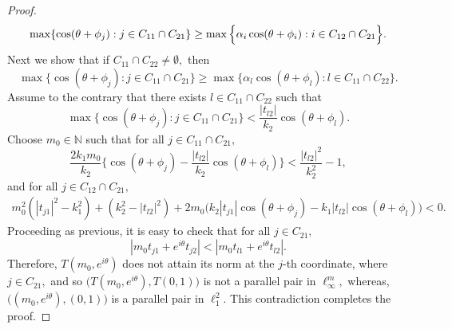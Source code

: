 \documentclass{amsart}
\theoremstyle{definition}
\theoremstyle{remark}
\numberwithin{equation}{section}
\begin{document}
\begin{proof}
\[\max\{\cos(\theta+\phi_j):j\in C_{11}\cap C_{21}\}\\
\geq \max\Big\{\alpha_i\cos(\theta+\phi_i):i\in C_{12}\cap C_{21}\Big\}.\]
Next we show that  if $C_{11}\cap C_{22}\neq \emptyset,$ then $$\max\{\cos(\theta+\phi_j):j\in C_{11}\cap C_{21}\}
\geq \max\Big\{\alpha_l\cos(\theta+\phi_l): l\in C_{11}\cap C_{22}\Big\}.$$ Assume to the contrary that there exists $l\in C_{11}\cap C_{22}$ such that 
\[\max\{\cos(\theta+\phi_j):j\in C_{11}\cap C_{21}\}<\frac{|t_{l2}|}{k_2}\cos(\theta+\phi_l).\]	
Choose $m_0\in \mathbb{N}$ such that for all $j\in C_{11}\cap C_{21},$
\[\frac{2k_1m_0}{k_2}\Big\{\cos(\theta+\phi_j)-\frac{|t_{l2}|}{k_2}\cos(\theta+\phi_l)\Big\}<\frac{|t_{l2}|^2}{k_2^2}-1,\]
and for all $j\in C_{12}\cap C_{21},$
\begin{eqnarray*}
	m_0^2(|t_{j1}|^2-k_1^2)+(k_2^2-|t_{l2}|^2)+2m_0\Big(k_2	|t_{j1}|\cos(\theta+\phi_j)-k_1|t_{l2}|\cos(\theta+\phi_l)\Big)<0.
\end{eqnarray*}
Proceeding as previous, it is easy to check that  for all $j\in C_{21},$
\[|m_0t_{j1}+e^{i\theta}t_{j2}|<|m_0t_{l1}+e^{i\theta}t_{l2}|.\]
Therefore, $T(m_0,e^{i\theta})$ does not attain its norm at the $j$-th coordinate, where $j\in C_{21},$ and so $\Big(T(m_0,e^{i\theta}),T(0,1)\Big)$ is not a parallel pair in $\ell_\infty^m,$ whereas, $\Big((m_0,e^{i\theta}),(0,1)\Big)$ is a parallel pair in $\ell_1^2.$ This contradiction completes the proof.

\end{proof}
\end{document}
